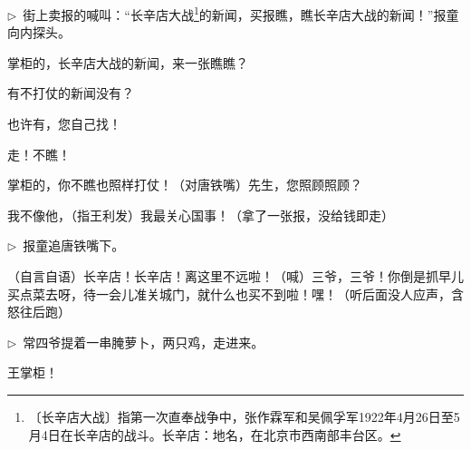 \documentclass[12pt,UTF-8,openany]{ctexbook}
\begin{document}
\begin{normalsize}
\begin{description}[itemsep=0.5ex,leftmargin=4.5em,labelwidth=4em]
    \end{description}
    
    \noindent $\triangleright$~街上卖报的喊叫：“长辛店大战\footnote{〔长辛店大战〕指第一次直奉战争中，张作霖军和吴佩孚军1922年4月26日至5月4日在长辛店的战斗。长辛店：地名，在北京市西南部丰台区。}的新闻，买报瞧，瞧长辛店大战的新闻！”报童向内探头。
    
    \begin{description}[itemsep=0.5ex,leftmargin=4.5em,labelwidth=4em]
    
    \item[{\color{script-4-7} 报童}]掌柜的，长辛店大战的新闻，来一张瞧瞧？
    
    \item[{\color{script-4-2} 王利发}]有不打仗的新闻没有？
    
    \item[{\color{script-4-7} 报童}]也许有，您自己找！
    
    \item[{\color{script-4-2} 王利发}]走！不瞧！
    
    \item[{\color{script-4-7} 报童}]掌柜的，你不瞧也照样打仗！（对唐铁嘴）先生，您照顾照顾？
    
    \item[{\color{script-4-6} 唐铁嘴}]我不像他，（指王利发）我最关心国事！（拿了一张报，没给钱即走）
    
    \end{description}
    
    \noindent $\triangleright$~报童追唐铁嘴下。
    
    \begin{description}[itemsep=0.5ex,leftmargin=4.5em,labelwidth=4em]
    
    \item[{\color{script-4-2} 王利发}]（自言自语）长辛店！长辛店！离这里不远啦！（喊）三爷，三爷！你倒是抓早儿买点菜去呀，待一会儿准关城门，就什么也买不到啦！嘿！（听后面没人应声，含怒往后跑）
    
    \end{description}
    
    \noindent $\triangleright$~常四爷提着一串腌萝卜，两只鸡，走进来。
    
    \begin{description}[itemsep=0.5ex,leftmargin=4.5em,labelwidth=4em]
    
    \item[{\color{script-4-8} 常四爷}]王掌柜！
    

\end{description}
\end{normalsize}
\end{document}
